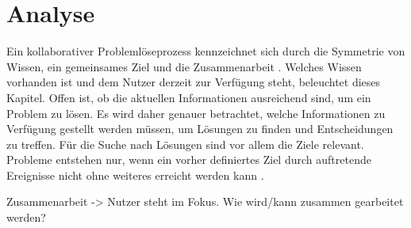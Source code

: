 
\chapter{Analyse}
\label{sec:Anforderungsanalyse}
Ein kollaborativer Problemlöseprozess kennzeichnet sich durch die Symmetrie von Wissen, ein gemeinsames Ziel und die Zusammenarbeit \cite{Rummel1958}. Welches Wissen vorhanden ist und dem Nutzer derzeit zur Verfügung steht, beleuchtet dieses Kapitel. Offen ist, ob die aktuellen Informationen ausreichend sind, um ein Problem zu lösen. Es wird daher genauer betrachtet, welche Informationen zu Verfügung gestellt werden müssen, um Lösungen zu finden und Entscheidungen zu treffen. Für die Suche nach Lösungen sind vor allem die Ziele relevant. Probleme entstehen nur, wenn ein vorher definiertes Ziel durch auftretende Ereignisse nicht ohne weiteres erreicht werden kann \cite{Funke2015, Betsch2011}. 

Zusammenarbeit -> Nutzer steht im Fokus. Wie wird/kann zusammen gearbeitet werden?



